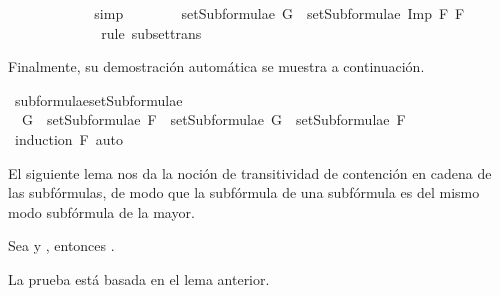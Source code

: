 \begin{isabellebody}
\ \ \ \ \ \ \ \ \isamarkupfalse%
\ {}\ \isamarkupfalse%
\ simp\isanewline
\ \ \ \ \ \ \isamarkupfalse%
\ {\isachardoublequoteopen}setSubformulae\ G\ {\isasymsubseteq}\ setSubformulae\ {\isacharparenleft}Imp\ F{}\ F{}{\isacharparenright}{\isachardoublequoteclose}\ \isanewline
\ \ \ \ \ \ \ \ \isamarkupfalse%
\ {}{}\ {}{}\ \isamarkupfalse%
\ {\isacharparenleft}rule\ subset{\isacharunderscore}trans{\isacharparenright}\isanewline
\ \ \ \ \isamarkupfalse%
\isanewline
\ \ \isamarkupfalse%
\isanewline
{}\isamarkupfalse%
%
\endisatagproof
{\isafoldproof}%
%
\isadelimproof
%
\endisadelimproof
%
\begin{isamarkuptext}%
Finalmente, su demostración automática se muestra a continuación.%
\end{isamarkuptext}\isamarkuptrue%
\isamarkupfalse%
\ subformulae{\isacharunderscore}setSubformulae{\isacharcolon}\isanewline
\ \ {\isachardoublequoteopen}G\ {\isasymin}\ setSubformulae\ F\ {\isasymLongrightarrow}\ setSubformulae\ G\ {\isasymsubseteq}\ setSubformulae\ F{\isachardoublequoteclose}\isanewline
%
\isadelimproof
\ \ %
\endisadelimproof
%
\isatagproof
{}\isamarkupfalse%
\ {\isacharparenleft}induction\ F{\isacharparenright}\ auto%
\endisatagproof
{\isafoldproof}%
%
\isadelimproof
%
\endisadelimproof
%
\begin{isamarkuptext}%
El siguiente lema nos da la noción de transitividad de contención 
  en cadena de las subfórmulas, de modo que la subfórmula de una 
  subfórmula es del mismo modo subfórmula de la mayor. 

  \begin{lema}
    Sea  y , entonces .
  \end{lema}


  \begin{demostracion}
  La prueba está basada en el lema anterior. 
  \end{demostracion}


\end{isamarkuptext}
\end{isabellebody}

